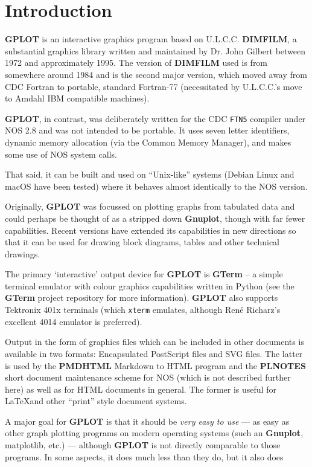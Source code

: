\documentclass[a4paper,twoside,11pt]{article}
\newcommand{\newpara}{\par\vspace{4mm}\noindent}
\begin{document}
\section{Introduction}
\newpara
\textbf{GPLOT} is an interactive graphics program based on U.L.C.C. \textbf{DIMFILM}, a substantial graphics
library written and maintained
by Dr. John Gilbert between 1972 and approximately 1995. The version of \textbf{DIMFILM} used is
from somewhere around 1984 and is the second major version, which moved away from CDC Fortran
to portable, standard Fortran-77 (necessitated by U.L.C.C.'s move to Amdahl IBM compatible machines). 
\newpara
\textbf{GPLOT}, in contrast, was deliberately written for the CDC \texttt{FTN5} compiler under NOS 2.8 and
was not intended to be portable. It uses seven letter identifiers, dynamic memory allocation (via
the Common Memory Manager), and makes some use of NOS system calls.
\newpara
That said, it can be built and used on ``Unix-like'' systems (Debian Linux and macOS have been tested)
where it behaves almost identically to the NOS version.
\newpara
Originally, \textbf{GPLOT} was focussed on plotting graphs from tabulated data and could perhaps be thought of
as a stripped down \textbf{Gnuplot}, though with far fewer capabilities.
Recent versions have extended its capabilities in new directions so that it can be used for drawing block diagrams,
tables and other technical drawings.
\newpara
The primary `interactive' output device for \textbf{GPLOT} is \textbf{GTerm} -- a simple terminal emulator with colour graphics
capabilities written in Python (see the \textbf{GTerm} project repository for more information). \textbf{GPLOT} also 
supports Tektronix 401x terminals (which \texttt{xterm} emulates, although Ren\'{e} Richarz's
excellent 4014 emulator is preferred).
\newpara
Output in the form of graphics files which  can be included in other documents is available in two formats:
Encapsulated PostScript files and SVG files. The latter is 
used by the \textbf{PMDHTML} Markdown to HTML program and the \textbf{PLNOTES} short document maintenance scheme for NOS
(which is not described further here) as well as for HTML documents in general. The former is useful for \LaTeX and other
``print'' style document systems.
\newpara
A major goal for \textbf{GPLOT} is that it should be \textit{very easy to use} --- as easy as other graph plotting
programs on modern operating systems (such an \textbf{Gnuplot}, matplotlib, etc.) --- although \textbf{GPLOT} is not
directly comparable to those programs. In some aspects, it does much less than they do, but it also does
\end{document}

